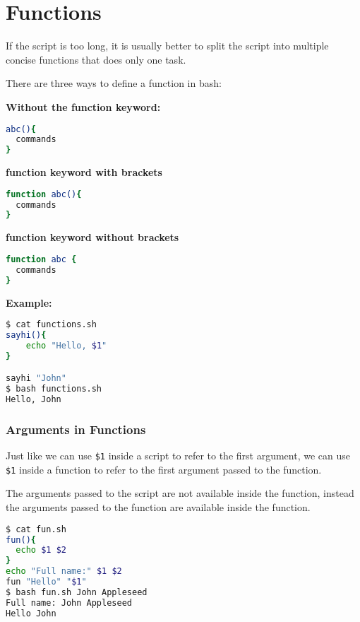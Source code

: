 \section{Functions}

If the script is too long, it is usually better to split the script into multiple concise functions that does only one task.

There are three ways to define a function in bash:

\textbf{Without the function keyword:}

\begin{lstlisting}[language=bash]
abc(){
  commands
}
\end{lstlisting}

\textbf{function keyword with brackets}

\begin{lstlisting}[language=bash]
function abc(){
  commands
}
\end{lstlisting}

\textbf{function keyword without brackets}

\begin{lstlisting}[language=bash]
function abc {
  commands
}
\end{lstlisting}

\textbf{Example:}

\begin{lstlisting}[language=bash]
$ cat functions.sh
sayhi(){
    echo "Hello, $1"
}

sayhi "John"
$ bash functions.sh
Hello, John
\end{lstlisting}

\subsubsection{Arguments in Functions}

Just like we can use \lstinline|$1| inside a script to refer to the first argument, we can use \lstinline|$1| inside a function to refer to the first argument passed to the function.

The arguments passed to the script are not available inside the function, instead the arguments passed to the function are available inside the function.

\begin{lstlisting}[language=bash]
$ cat fun.sh
fun(){
  echo $1 $2
}
echo "Full name:" $1 $2
fun "Hello" "$1"
$ bash fun.sh John Appleseed
Full name: John Appleseed
Hello John
\end{lstlisting}

